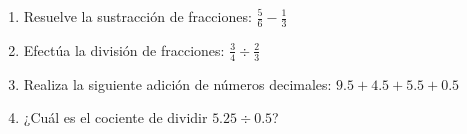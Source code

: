 \documentclass[10pt,a4paper]{article}
\begin{document}
\begin{enumerate}[label=\textbf{\arabic*.}]
\begin{enumerate}[label=\textbf{\Alph*)}]
\end{enumerate}
\vspace{0.15cm}
\item Resuelve la sustracción de fracciones: \(\frac{5}{6} - \frac{1}{3}\)
\begin{enumerate}[label=\textbf{\Alph*)}]
\end{enumerate}
\vspace{0.15cm}
\item Efectúa la división de fracciones: \(\frac{3}{4} \div \frac{2}{3}\)
\begin{enumerate}[label=\textbf{\Alph*)}]
\end{enumerate}
\vspace{0.15cm}
\item Realiza la siguiente adición de números decimales: \(9.5 + 4.5 + 5.5 + 0.5\)
\begin{enumerate}[label=\textbf{\Alph*)}]
\end{enumerate}
\vspace{0.15cm}
\item ¿Cuál es el cociente de dividir \(5.25 \div 0.5\)?
\begin{enumerate}[label=\textbf{\Alph*)}]

\end{enumerate}
\end{enumerate}
\end{document}
